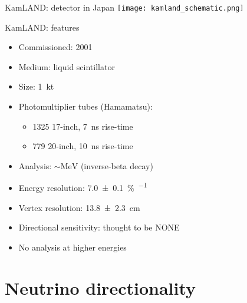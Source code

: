 \documentclass[14pt]{beamer}
\begin{document}
\begin{frame}{KamLAND: \Pnu detector in Japan}
	\centering
	\texttt{[image: kamland\_schematic.png]}
\end{frame}

\begin{frame}[t]{KamLAND: features}
	\begin{itemize}
		\item<1-> Commissioned: \num{2001}
		\item<1-> Medium: liquid scintillator
		\item<1-> Size: \SI{1}{\kilo\tonne}
		\item<1-> Photomultiplier tubes (Hamamatsu):\\
			\begin{itemize}
				\item \num{1325} 17-inch, \SI{7}{\nano\second} rise-time
				\item \num{779} 20-inch, \SI{10}{\nano\second} rise-time
			\end{itemize}
		\item<1-> Analysis: $\sim\!\si{\mega\electronvolt}$ \APnue
			(inverse-beta decay)
		\item<1-> Energy resolution:
			\SI{7.0\pm0.1}{\percent\per{}}
		\item<1-> Vertex resolution:
			\SI{13.8\pm2.3}{\centi\meter}
		\item<2-> {\color{red}Directional sensitivity: thought to be NONE}
		\item<3-> {\color{red}No analysis at higher energies}
	\end{itemize}
\end{frame}

\section{Neutrino directionality}
\end{document}
